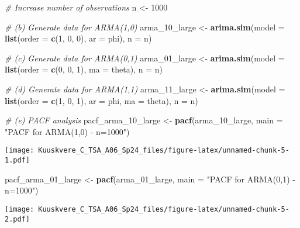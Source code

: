 \documentclass[
]{article}
\newenvironment{Shaded}{\begin{snugshade}}{\end{snugshade}}
\newcommand{\AttributeTok}[1]{\textcolor[rgb]{0.13,0.29,0.53}{#1}}
\newcommand{\CommentTok}[1]{\textcolor[rgb]{0.56,0.35,0.01}{\textit{#1}}}
\newcommand{\DecValTok}[1]{\textcolor[rgb]{0.00,0.00,0.81}{#1}}
\newcommand{\FunctionTok}[1]{\textcolor[rgb]{0.13,0.29,0.53}{\textbf{#1}}}
\newcommand{\NormalTok}[1]{#1}
\newcommand{\OtherTok}[1]{\textcolor[rgb]{0.56,0.35,0.01}{#1}}
\newcommand{\StringTok}[1]{\textcolor[rgb]{0.31,0.60,0.02}{#1}}
\begin{document}
\begin{Shaded}
\begin{Highlighting}[]
\CommentTok{\# Increase number of observations}
\NormalTok{n }\OtherTok{\textless{}{-}} \DecValTok{1000}

\CommentTok{\# (b) Generate data for ARMA(1,0)}
\NormalTok{arma\_10\_large }\OtherTok{\textless{}{-}} \FunctionTok{arima.sim}\NormalTok{(}\AttributeTok{model =} \FunctionTok{list}\NormalTok{(}\AttributeTok{order =} \FunctionTok{c}\NormalTok{(}\DecValTok{1}\NormalTok{, }\DecValTok{0}\NormalTok{, }\DecValTok{0}\NormalTok{), }\AttributeTok{ar =}\NormalTok{ phi), }\AttributeTok{n =}\NormalTok{ n)}

\CommentTok{\# (c) Generate data for ARMA(0,1)}
\NormalTok{arma\_01\_large }\OtherTok{\textless{}{-}} \FunctionTok{arima.sim}\NormalTok{(}\AttributeTok{model =} \FunctionTok{list}\NormalTok{(}\AttributeTok{order =} \FunctionTok{c}\NormalTok{(}\DecValTok{0}\NormalTok{, }\DecValTok{0}\NormalTok{, }\DecValTok{1}\NormalTok{), }\AttributeTok{ma =}\NormalTok{ theta), }\AttributeTok{n =}\NormalTok{ n)}

\CommentTok{\# (d) Generate data for ARMA(1,1)}
\NormalTok{arma\_11\_large }\OtherTok{\textless{}{-}} \FunctionTok{arima.sim}\NormalTok{(}\AttributeTok{model =} \FunctionTok{list}\NormalTok{(}\AttributeTok{order =} \FunctionTok{c}\NormalTok{(}\DecValTok{1}\NormalTok{, }\DecValTok{0}\NormalTok{, }\DecValTok{1}\NormalTok{), }\AttributeTok{ar =}\NormalTok{ phi, }\AttributeTok{ma =}\NormalTok{ theta), }\AttributeTok{n =}\NormalTok{ n)}

\CommentTok{\# (e) PACF analysis}
\NormalTok{pacf\_arma\_10\_large }\OtherTok{\textless{}{-}} \FunctionTok{pacf}\NormalTok{(arma\_10\_large, }\AttributeTok{main =} \StringTok{"PACF for ARMA(1,0) {-} n=1000"}\NormalTok{)}
\end{Highlighting}
\end{Shaded}

\texttt{[image: Kuuskvere\_C\_TSA\_A06\_Sp24\_files/figure-latex/unnamed-chunk-5-1.pdf]}

\begin{Shaded}
\begin{Highlighting}[]
\NormalTok{pacf\_arma\_01\_large }\OtherTok{\textless{}{-}} \FunctionTok{pacf}\NormalTok{(arma\_01\_large, }\AttributeTok{main =} \StringTok{"PACF for ARMA(0,1) {-} n=1000"}\NormalTok{)}
\end{Highlighting}
\end{Shaded}

\texttt{[image: Kuuskvere\_C\_TSA\_A06\_Sp24\_files/figure-latex/unnamed-chunk-5-2.pdf]}
\end{document}
